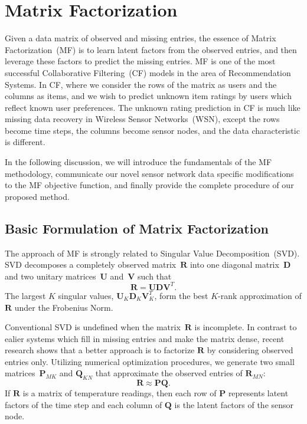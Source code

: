 \section{Matrix Factorization}  \label{sec:mf}

Given a data matrix of observed and missing entries, the essence of Matrix Factorization~(MF) is to learn latent factors from the observed entries, and then leverage these factors to predict the missing entries.
MF is one of the most successful Collaborative Filtering~(CF) models in the area of Recommendation Systems.
In CF, where we consider the rows of the matrix as users and the columns as items, and we wish to predict unknown item ratings by users which reflect known user preferences.
The unknown rating prediction in CF is much like missing data recovery in Wireless Sensor Networks~(WSN), except the rows become time steps, the columns become sensor nodes, and the data characteristic is different. 

In the following discussion, we will introduce the fundamentals of the MF methodology, communicate our novel sensor network data specific modifications to the MF objective function, and finally provide the complete procedure of our proposed method.

\subsection{Basic Formulation of Matrix Factorization}

The approach of MF is strongly related to Singular Value Decomposition~(SVD).
SVD decomposes a completely observed matrix~$\mathbf{R}$ into one diagonal matrix~$\mathbf{D}$ and two unitary matrices~$\mathbf{U}$ and~$\mathbf{V}$ such that
\begin{equation*} \mathbf{R} = \mathbf{U}\mathbf{D}\mathbf{V}^T. \end{equation*}
The largest $K$ singular values, $\mathbf{U}_K \mathbf{D}_K \mathbf{V}_K^T$, form the best $K$-rank approximation of $\mathbf{R}$ under the Frobenius Norm. 

Conventional SVD is undefined when the matrix~$\mathbf{R}$ is incomplete.
In contrast to ealier systems which fill in missing entries and make the matrix dense, recent research shows\cite{koren2009matrix} that a better approach is to factorize $\mathbf{R}$ by considering observed entries only.
Utilizing numerical optimization procedures, we generate two small matrices~$\mathbf{P}_{MK}$ and $\mathbf{Q}_{KN}$ that approximate the observed entries of $\mathbf{R}_{MN}$:
\begin{equation*}\mathbf{R} \approx \mathbf{P} \mathbf{Q}.\end{equation*}
If $\mathbf{R}$ is a matrix of temperature readings, then each row of $\mathbf{P}$ represents latent factors of the time step and each column of $\mathbf{Q}$ is the latent factors of the sensor node.

